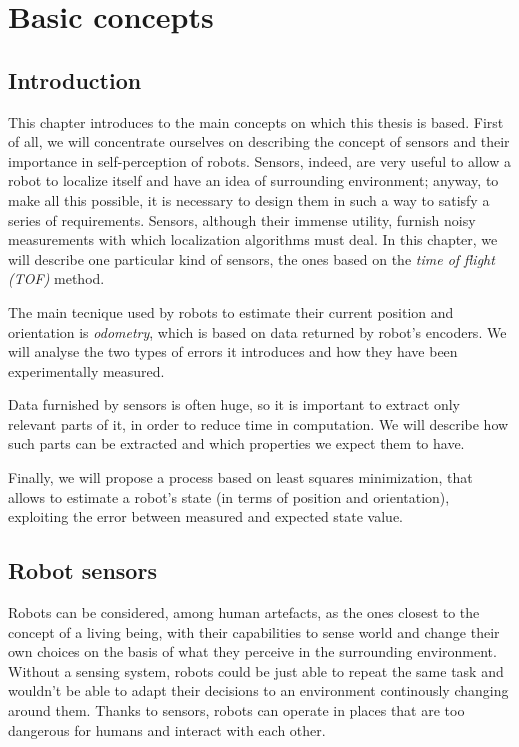 \documentclass[a4paper, onecolumn]{report}
\begin{document}
\chapter{Basic concepts}
\section{Introduction}
This chapter introduces to the main concepts on which this thesis is based. 
First of all, we will concentrate ourselves on describing the concept of sensors and their importance in self-perception of robots. Sensors, indeed, are very useful to allow a robot to localize itself and have an idea of surrounding environment; anyway, to make all this possible, it is necessary to design them in such a way to satisfy a series of requirements. Sensors, although their immense utility, furnish noisy measurements with which localization algorithms must deal.
In this chapter, we will describe one particular kind of sensors, the ones based on the \emph{time of flight (TOF)} method.

The main tecnique used by robots to estimate their current position and orientation is \emph{odometry}, which is based on data returned by robot's encoders. We will analyse the two types of errors it introduces and how they have been experimentally measured.

Data furnished by sensors is often huge, so it is important to extract only relevant parts of it, in order to reduce time in computation. We will describe how such parts can be extracted and which properties we expect them to have.

Finally, we will propose a process based on least squares minimization, that allows to estimate a robot's state (in terms of position and orientation), exploiting the error between measured and expected state value.

\section{Robot sensors}
Robots can be considered, among human artefacts, as the ones closest to the concept of a living being, with their capabilities to sense world and change their own choices on the basis of what they perceive in the surrounding environment. Without a sensing system, robots could be just able to repeat the same task and wouldn't be able to adapt their decisions to an environment continously changing around them. Thanks to sensors, robots can operate in places that are too dangerous for humans and interact with each other. 
\end{document}
